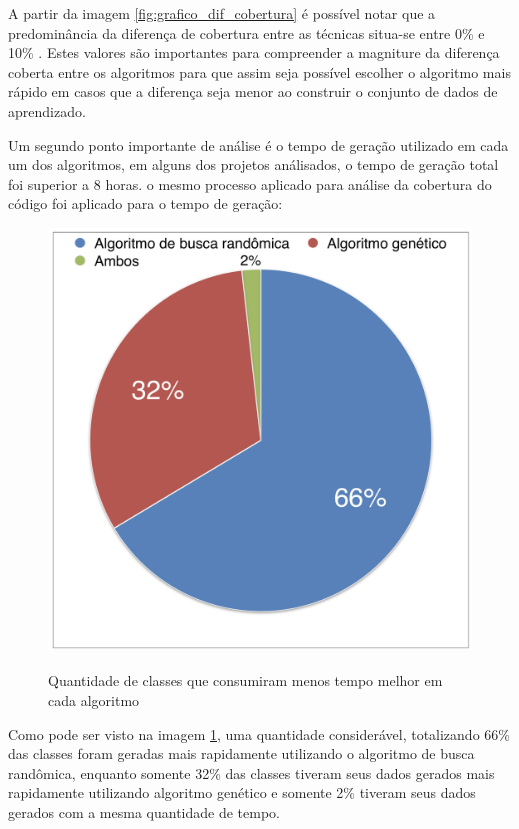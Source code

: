 \documentclass[
	12pt,				%
	oneside,			%
	a4paper,			%
	english,			%
	brazil				%
	]{abntex2ppgsi}
\begin{document}
A partir da imagem \ref{fig:grafico_dif_cobertura} é possível notar que a predominância da diferença de cobertura entre as técnicas situa-se entre 0\% e 10\% . Estes valores são importantes para compreender a magniture da diferença coberta entre os algoritmos para que assim seja possível escolher o algoritmo mais rápido em casos que a diferença seja menor ao construir o conjunto de dados de aprendizado.

Um segundo ponto importante de análise é o tempo de geração utilizado em cada um dos algoritmos, em alguns dos projetos análisados, o tempo de geração total foi superior a 8 horas. o mesmo processo aplicado para análise da cobertura do código foi aplicado para o tempo de geração:\\

\begin{figure}[H]%
	\centering
 	  \caption{Quantidade de classes que consumiram menos tempo melhor em cada algoritmo}
		\includegraphics[width=\textwidth]{tempo_evosuite.png}
	\label{fig:distribuicao-tempo-evosuite}
\end{figure}

Como pode ser visto na imagem \ref{fig:distribuicao-tempo-evosuite}, uma quantidade considerável, totalizando 66\% das classes foram geradas mais rapidamente utilizando o algoritmo de busca randômica, enquanto somente 32\% das classes tiveram seus dados gerados mais rapidamente utilizando algoritmo genético e somente 2\% tiveram seus dados gerados com a mesma quantidade de tempo.
\end{document}
